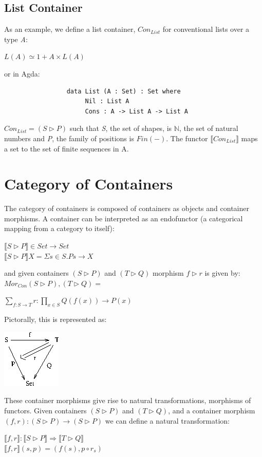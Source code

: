 \documentclass[12pt]{report}
\begin{document}
\subsection{List Container}
As an example, we define a list container, $Con_{List}$ for conventional lists over a type \textit{A}:
\begin{center}
$ L(A) \simeq 1 + A \times L(A) $
\end{center}
or in Agda:
\begin{verbatim}
                 data List (A : Set) : Set where
                      Nil : List A
                      Cons : A -> List A -> List A
\end{verbatim}
 $Con_{List} = (S \rhd P) $ such that \textit{S}, the set of shapes, is $\mathbb{N}$, the set of natural numbers and \textit{P}, the family of positions is $Fin(-)$. The functor $\llbracket Con_{List} \rrbracket$ maps a set to the set of finite sequences in A.


\section{Category of Containers}
The category of containers is composed of containers as objects and container morphisms.
A container can be interpreted as an endofunctor (a categorical mapping from a category to itself):
\begin{center}
$\llbracket S \rhd P\rrbracket \in Set \to Set$\\
$ \llbracket S \rhd P\rrbracket X = \Sigma s \in S. P s \to X $
\end{center}
and given containers $ (S \rhd P)$ and $ (T \rhd Q)$ morphism $ f \rhd r $ is given by:
\linebreak
\linebreak
$Mor_{Con}(S \rhd P),(T \rhd Q) = $
\begin{center}
$ \sum_{f : S \to T} r : \prod_{x \in S} Q(f(x)) \to P(x)$
\end{center}
Pictorally, this is represented as:
\begin{center}
\includegraphics[scale=1]{cm.png}
\end{center}
These container morphisms give rise to natural transformations, morphisms of functors. Given containers $ (S \rhd P)$ and $ (T \rhd Q)$, and a container morphism $ (f , r) : (S \rhd P) \to (S \rhd P)$ we can define a natural transformation:
\begin{center}
$ \llbracket f,r\rrbracket : \llbracket S \rhd P\rrbracket \Rightarrow \llbracket T \rhd Q\rrbracket$ \\
$  \llbracket f,r\rrbracket (s,p) = (f(s),p \circ r_s) $
\end{center}
\end{document}
